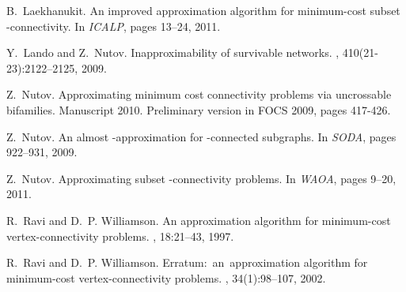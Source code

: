 \begin{thebibliography}{10}
B.~Laekhanukit.
\newblock An improved approximation algorithm for minimum-cost subset
  -connectivity.
\newblock In {\em ICALP}, pages 13--24, 2011.

Y.~Lando and Z.~Nutov.
\newblock Inapproximability of survivable networks.
, 410(21-23):2122--2125, 2009.

Z.~Nutov.
\newblock Approximating minimum cost connectivity problems via uncrossable
  bifamilies.
\newblock Manuscript 2010. Preliminary version in FOCS 2009, pages 417-426.

Z.~Nutov.
\newblock An almost {}-approximation for -connected subgraphs.
\newblock In {\em SODA}, pages 922--931, 2009.

Z.~Nutov.
\newblock Approximating subset -connectivity problems.
\newblock In {\em WAOA}, pages 9--20, 2011.

R.~Ravi and D.~P. Williamson.
\newblock An approximation algorithm for minimum-cost vertex-connectivity
  problems.
, 18:21--43, 1997.

R.~Ravi and D.~P. Williamson.
\newblock Erratum:~an~approxi\-mation algorithm for minimum-cost
  vertex-connectivity problems.
, 34(1):98--107, 2002.

\end{thebibliography}



